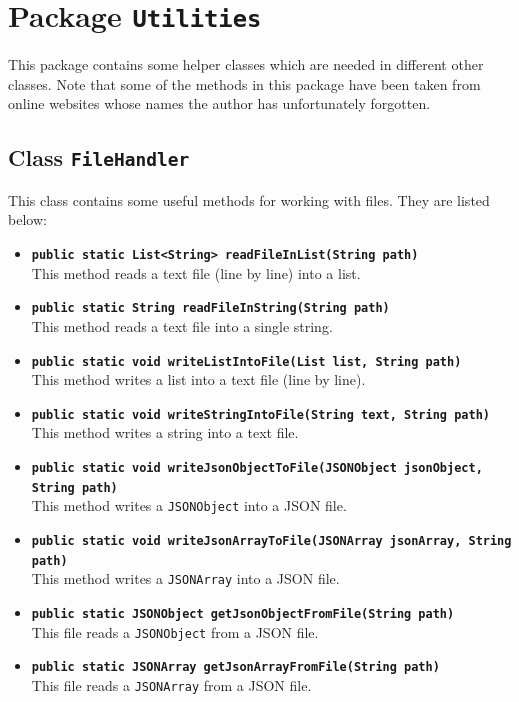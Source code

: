 \documentclass[a4paper]{article}
\begin{document}
\clearpage
\section{Package \texttt{Utilities}}
This package contains some helper classes which are needed in different other classes. Note that some of the methods in this package have been taken from online websites whose names the author has unfortunately forgotten.
\subsection{Class \texttt{FileHandler}}
This class contains some useful methods for working with files. They are listed below:
\begin{itemize}
	\item \texttt{\textbf{public static List<String> readFileInList(String path)}}\\
	This method reads a text file (line by line) into a list.
	
	\item \texttt{\textbf{public static String readFileInString(String path)}}\\
	This method reads a text file into a single string.
	
	\item \texttt{\textbf{public static void writeListIntoFile(List list, String path)}}\\
	This method writes a list into a text file (line by line).
	
	\item \texttt{\textbf{public static void writeStringIntoFile(String text, String path)}}\\
	This method writes a string into a text file.
	
	\item \texttt{\textbf{public static void writeJsonObjectToFile(JSONObject jsonObject, String path)}}\\
	This method writes a \texttt{JSONObject} into a JSON file.
	
	\item \texttt{\textbf{public static void writeJsonArrayToFile(JSONArray jsonArray, String path)}}\\
	This method writes a \texttt{JSONArray} into a JSON file.
	
	\item \texttt{\textbf{public static JSONObject getJsonObjectFromFile(String path)}}\\
	This file reads a \texttt{JSONObject} from a JSON file.	

	\item \texttt{\textbf{public static JSONArray getJsonArrayFromFile(String path)}}\\
	This file reads a \texttt{JSONArray} from a JSON file.

	
	
\end{itemize}
\end{document}
